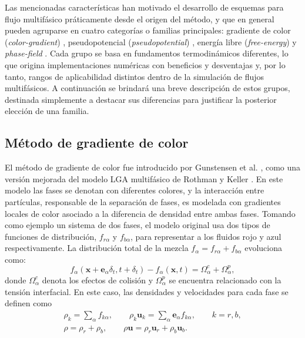 Las mencionadas caracter\'isticas han motivado el desarrollo de esquemas para flujo multif\'asico pr\'aticamente desde el origen del m\'etodo, y que en general pueden agruparse en cuatro categor\'ias o familias principales: gradiente de color (\emph{color-gradient}) \cite{liu_three-dimensional_2012,gunstensen_lattice_1991}, pseudopotencial (\emph{pseudopotential}) \cite{shan_lattice_1993,shan_simulation_1994,chen_critical_2014}, energ\'ia libre (\emph{free-energy}) \cite{swift_lattice_1996,inamuro_galilean_2000} y \emph{phase-field} \cite{he_lattice_1999,liang_phase-field-based_2014}. Cada grupo se basa en fundamentos termodin\'amicos diferentes, lo que origina implementaciones num\'ericas con beneficios y desventajas y, por lo tanto, rangos de aplicabilidad distintos dentro de la simulaci\'on de flujos multif\'asicos. A continuaci\'on se brindar\'a una breve descripci\'on de estos grupos, destinada simplemente a destacar sus diferencias para justificar la posterior elecci\'on de una familia.
\newpage

\subsection*{M\'etodo de gradiente de color}
El m\'etodo de gradiente de color fue introducido por Gunstensen et al. \cite{gunstensen_lattice_1991}, como una versi\'on mejorada del modelo LGA multif\'asico de Rothman y Keller \cite{rothman_immiscible_1988}. En este modelo las fases se denotan con diferentes colores, y la interacci\'on entre part\'iculas, responsable de la separaci\'on de fases, es modelada con gradientes locales de color asociado a la diferencia de densidad entre ambas fases. Tomando como ejemplo un sistema de dos fases, el modelo original usa dos tipos de funciones de distribuci\'on, $f_{r{\alpha}}$ y $f_{b{\alpha}}$, para representar a los fluidos rojo y azul respectivamente. La distribuci\'on total de la mezcla $f_{\alpha} = f_{r{\alpha}}+f_{b{\alpha}}$ evoluciona como:
\begin{equation}
	f_{\alpha}(\bm{x}+\bm{e}_{\alpha} \delta_t,t+\delta_t) - f_{\alpha}(\bm{x},t) = \Omega_{\alpha}^c + \Omega_{\alpha}^p,
\end{equation}
donde $\Omega_{\alpha}^c$ denota los efectos de colisi\'on y $\Omega_{\alpha}^p$ se encuentra relacionado con la tensi\'on interfacial. En este caso, las densidades y velocidades para cada fase se definen como
\begin{equation}
	\begin{gathered}
	\rho_k = \sum_{\alpha} f_{k{\alpha}}, \qquad \rho_k\bm{u}_k = \sum_{\alpha} \bm{e}_{\alpha} f_{k{\alpha}}, \qquad k=r,b, \\
	\rho = \rho_r + \rho_b, \qquad \rho\bm{u} = \rho_r\bm{u}_r + \rho_b\bm{u}_b.
	\end{gathered}
\end{equation}

